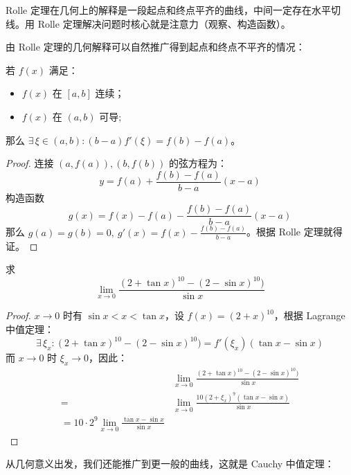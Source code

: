 Rolle 定理在几何上的解释是一段起点和终点平齐的曲线，中间一定存在水平切线。用 Rolle 定理解决问题时核心就是注意力（观察、构造函数）。

由 Rolle 定理的几何解释可以自然推广得到起点和终点不平齐的情况：

\begin{theorem}
	若 $f(x)$ 满足：
	
	\begin{itemize}
		\item $f(x)$ 在 $[a, b]$ 连续；
		\item $f(x)$ 在 $(a, b)$ 可导;
	\end{itemize}

	那么 $\exists\,\xi \in (a, b): (b - a) f'(\xi) = f(b) - f(a)$。

	\begin{proof}
		连接 $(a, f(a)), (b, f(b))$ 的弦方程为：
		$$
		y = f(a) + \frac{f(b) - f(a)}{b - a} (x - a)
		$$
		构造函数
		$$
		g(x) = f(x) - f(a) - \frac{f(b) - f(a)}{b - a} (x - a)
		$$
		那么 $g(a) = g(b) = 0,\ g'(x) = f(x) - \frac{f(b) - f(a)}{b - a}$。根据 Rolle 定理就得证。
	\end{proof}
\end{theorem}

\begin{example}
	求
	$$
	\lim_{x \to 0} \frac{(2 + \tan x)^{10} - (2 - \sin x)^{10})}{\sin x}
	$$
	\begin{proof}
		$x \to 0$ 时有 $\sin x < x < \tan x$，设 $f(x) = (2 + x)^10$，根据 Lagrange 中值定理：
		$$
		\exists\,\xi_x: (2 + \tan x)^{10} - (2 - \sin x)^{10}) = f'(\xi_x) (\tan x - \sin x)
		$$
		而 $x \to 0$ 时 $\xi_x \to 0$，因此：
		$$
		\begin{aligned}
			& \lim_{x \to 0} \frac{(2 + \tan x)^{10} - (2 - \sin x)^{10})}{\sin x} \\
			= & \lim_{x \to 0} \frac{10 (2 + \xi_x)^9 (\tan x - \sin x)}{\sin x} \\
			= 10 \cdot 2^9 \lim_{x \to 0} \frac{\tan x - \sin x}{\sin x}
		\end{aligned}
		$$
	\end{proof}
\end{example}

从几何意义出发，我们还能推广到更一般的曲线，这就是 Cauchy 中值定理：

